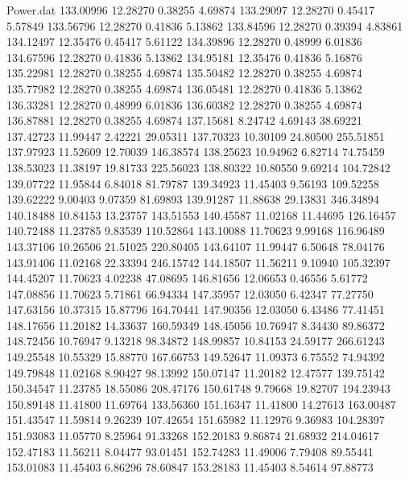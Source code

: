 \begin{filecontents}{Power.dat}
 133.00996   12.28270    0.38255    4.69874
 133.29097   12.28270    0.45417    5.57849
 133.56796   12.28270    0.41836    5.13862
 133.84596   12.28270    0.39394    4.83861
 134.12497   12.35476    0.45417    5.61122
 134.39896   12.28270    0.48999    6.01836
 134.67596   12.28270    0.41836    5.13862
 134.95181   12.35476    0.41836    5.16876
 135.22981   12.28270    0.38255    4.69874
 135.50482   12.28270    0.38255    4.69874
 135.77982   12.28270    0.38255    4.69874
 136.05481   12.28270    0.41836    5.13862
 136.33281   12.28270    0.48999    6.01836
 136.60382   12.28270    0.38255    4.69874
 136.87881   12.28270    0.38255    4.69874
 137.15681    8.24742    4.69143   38.69221
 137.42723   11.99447    2.42221   29.05311
 137.70323   10.30109   24.80500  255.51851
 137.97923   11.52609   12.70039  146.38574
 138.25623   10.94962    6.82714   74.75459
 138.53023   11.38197   19.81733  225.56023
 138.80322   10.80550    9.69214  104.72842
 139.07722   11.95844    6.84018   81.79787
 139.34923   11.45403    9.56193  109.52258
 139.62222    9.00403    9.07359   81.69893
 139.91287   11.88638   29.13831  346.34894
 140.18488   10.84153   13.23757  143.51553
 140.45587   11.02168   11.44695  126.16457
 140.72488   11.23785    9.83539  110.52864
 143.10088   11.70623    9.99168  116.96489
 143.37106   10.26506   21.51025  220.80405
 143.64107   11.99447    6.50648   78.04176
 143.91406   11.02168   22.33394  246.15742
 144.18507   11.56211    9.10940  105.32397
 144.45207   11.70623    4.02238   47.08695
 146.81656   12.06653    0.46556    5.61772
 147.08856   11.70623    5.71861   66.94334
 147.35957   12.03050    6.42347   77.27750
 147.63156   10.37315   15.87796  164.70441
 147.90356   12.03050    6.43486   77.41451
 148.17656   11.20182   14.33637  160.59349
 148.45056   10.76947    8.34430   89.86372
 148.72456   10.76947    9.13218   98.34872
 148.99857   10.84153   24.59177  266.61243
 149.25548   10.55329   15.88770  167.66753
 149.52647   11.09373    6.75552   74.94392
 149.79848   11.02168    8.90427   98.13992
 150.07147   11.20182   12.47577  139.75142
 150.34547   11.23785   18.55086  208.47176
 150.61748    9.79668   19.82707  194.23943
 150.89148   11.41800   11.69764  133.56360
 151.16347   11.41800   14.27613  163.00487
 151.43547   11.59814    9.26239  107.42654
 151.65982   11.12976    9.36983  104.28397
 151.93083   11.05770    8.25964   91.33268
 152.20183    9.86874   21.68932  214.04617
 152.47183   11.56211    8.04477   93.01451
 152.74283   11.49006    7.79408   89.55441
 153.01083   11.45403    6.86296   78.60847
 153.28183   11.45403    8.54614   97.88773

\end{filecontents}
